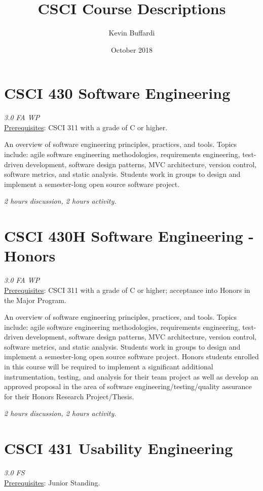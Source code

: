 \documentclass[12pt]{article}
\title{CSCI Course Descriptions}
\author{Kevin Buffardi}
\date{October 2018}
\begin{document}
  \maketitle
  \section*{CSCI 430 Software Engineering}	 	
  \textit{3.0 FA WP} \\
  \underline{Prerequisites}: CSCI 311 with a grade of C or higher.

  An overview of software engineering principles, practices, and tools. Topics include: agile software engineering methodologies, requirements engineering, test-driven development, software design patterns, MVC architecture, version control, software metrics, and static analysis. Students work in groups to design and implement a semester-long open source software project. 

  \textit{2 hours discussion, 2 hours activity.}

  \section*{CSCI 430H Software Engineering - Honors}    
  \textit{3.0 FA WP} \\
  \underline{Prerequisites}: CSCI 311 with a grade of C or higher; acceptance into Honors in the Major Program.

  An overview of software engineering principles, practices, and tools. Topics include: agile software engineering methodologies, requirements engineering, test-driven development, software design patterns, MVC architecture, version control, software metrics, and static analysis. Students work in groups to design and implement a semester-long open source software project. Honors students enrolled in this course will be required to implement a significant additional instrumentation, testing, and analysis for their team project as well as develop an approved proposal in the area of software engineering/testing/quality assurance for their Honors Research Project/Thesis.

  \textit{2 hours discussion, 2 hours activity.}
  
  \section*{CSCI 431 Usability Engineering}
  \textit{3.0 FS} \\
  \underline{Prerequisites}: Junior Standing.
\end{document}
